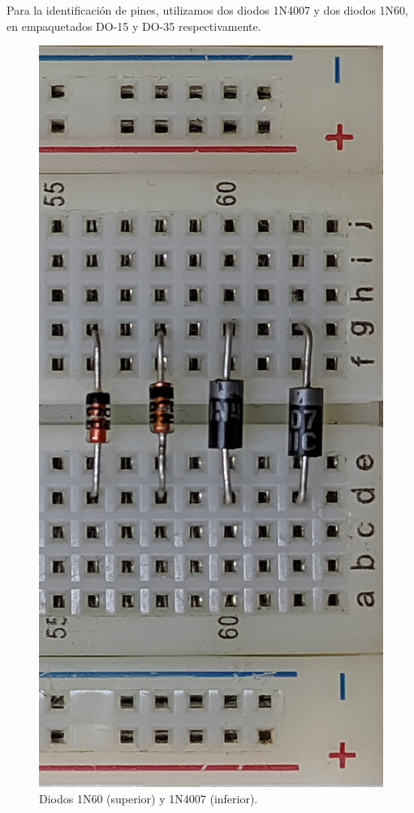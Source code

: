 \documentclass[chaptersright]{informeutn}
\begin{document}
    Para la identificación de pines, utilizamos dos diodos 1N4007 y dos diodos 1N60, en empaquetados DO-15 y DO-35
    respectivamente.

    \begin{figure}[!ht]
      \centering
      \includegraphics[angle=-90, width=.5\textwidth]{pictures/prot_diod-all.jpg}
      \caption{Diodos 1N60 (superior) y 1N4007 (inferior).}
    \end{figure}
\end{document}
